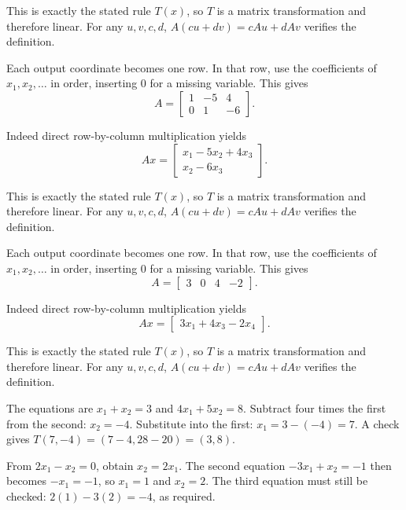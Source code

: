 This is exactly the stated rule $T(x)$, so $T$ is a matrix transformation and therefore linear. For any $u,v,c,d$, $A(cu+dv)=cAu+dAv$ verifies the definition.



Each output coordinate becomes one row. In that row, use the coefficients of $x_1,x_2,\ldots$ in order, inserting $0$ for a missing variable. This gives
\[ A=\begin{bmatrix}1 & -5 & 4\\0 & 1 & -6\end{bmatrix}.\]

Indeed direct row-by-column multiplication yields
\[ Ax=\begin{bmatrix}x_{1} - 5 x_{2} + 4 x_{3}\\x_{2} - 6 x_{3}\end{bmatrix}.\]

This is exactly the stated rule $T(x)$, so $T$ is a matrix transformation and therefore linear. For any $u,v,c,d$, $A(cu+dv)=cAu+dAv$ verifies the definition.



Each output coordinate becomes one row. In that row, use the coefficients of $x_1,x_2,\ldots$ in order, inserting $0$ for a missing variable. This gives
\[ A=\begin{bmatrix}3 & 0 & 4 & -2\end{bmatrix}.\]

Indeed direct row-by-column multiplication yields
\[ Ax=\begin{bmatrix}3 x_{1} + 4 x_{3} - 2 x_{4}\end{bmatrix}.\]

This is exactly the stated rule $T(x)$, so $T$ is a matrix transformation and therefore linear. For any $u,v,c,d$, $A(cu+dv)=cAu+dAv$ verifies the definition.


The equations are $x_1+x_2=3$ and $4x_1+5x_2=8$.
Subtract four times the first from the second: $x_2=-4$.
Substitute into the first: $x_1=3-(-4)=7$.
A check gives $T(7,-4)=(7-4,28-20)=(3,8)$.

From $2x_1-x_2=0$, obtain $x_2=2x_1$. The second equation
$-3x_1+x_2=-1$ then becomes $-x_1=-1$, so $x_1=1$ and
$x_2=2$. The third equation must still be checked:
$2(1)-3(2)=-4$, as required.

